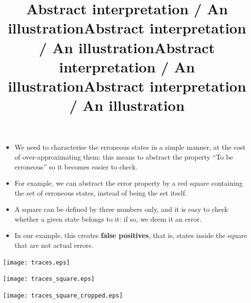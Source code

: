 \documentclass[wide]{slides}
\begin{document}
\begin{slide}
  \title{Abstract interpretation / An illustration}

  \begin{itemize}

    \item We need to characterise the erroneous states in a simple
      manner, at the cost of over\hyp{}approximating them: this means
      to abstract the property ``To be erroneous'' so it becomes
      easier to check.

    \item For example, we can abstract the error property by a red
      square containing the set of erroneous states, instead of being
      the set itself.

    \item A square can be defined by three numbers only, and it is
      easy to check whether a given state belongs to it: if so, we
      deem it an error.

    \item In our example, this creates \textbf{false positives}, that
      is, states inside the square that are not actual errors.

  \end{itemize}
\end{slide}

\begin{slide}
  \title{Abstract interpretation / An illustration}

  \begin{center}
    \texttt{[image: traces.eps]}
  \end{center}

\end{slide}

\begin{slide}
  \title{Abstract interpretation / An illustration}

  \begin{center}
    \texttt{[image: traces\_square.eps]}
  \end{center}

\end{slide}

\begin{slide}
  \title{Abstract interpretation / An illustration}

  \begin{center}
\texttt{[image: traces\_square\_cropped.eps]}
  \end{center}

\end{slide}
\end{document}
